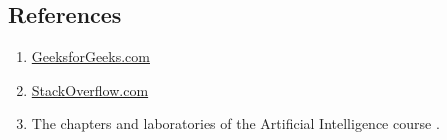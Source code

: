 \documentclass{article}
\begin{document}
\subsection {References}
\begin{enumerate}
\item \href{https://www.geeksforgeeks.org/}{GeeksforGeeks.com}
\item \href{https://stackoverflow.com/}{StackOverflow.com}
\item The chapters and laboratories of the Artificial Intelligence course .

\end{enumerate}
\end{document}
